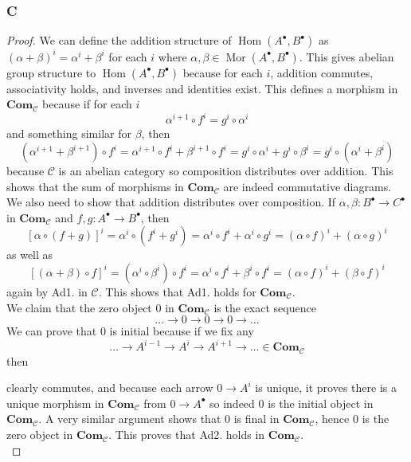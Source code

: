 \documentclass{article}
\newcommand{\fC}{\mathscr{C}}
\newcommand{\Com}{\mathbf{Com}} %
\DeclareMathOperator{\Hom}{\mathrm{Hom}}
\DeclareMathOperator{\Mor}{\mathrm{Mor}}
\begin{document}
\subsubsection{C}\label{1.6.C}
\begin{proof}
    We can define the addition structure of $\Hom(A^\bullet, B^\bullet)$ as $(\alpha+\beta)^i=\alpha^i+\beta^i$ for each $i$ where $\alpha,\beta\in \Mor(A^\bullet,B^\bullet)$. This gives abelian group structure to $\Hom(A^\bullet,B^\bullet)$ because for each $i$, addition commutes, associativity holds, and inverses and identities exist. This defines a morphism in $\Com_\fC$ because if for each $i$
    \[
    \alpha^{i+1}\circ f^i=g^i\circ \alpha^i
    \]
    and something similar for $\beta$, then
    \[
    (\alpha^{i+1}+\beta^{i+1})\circ f^i=\alpha^{i+1}\circ f^i+\beta^{i+1}\circ f^i=g^i\circ \alpha^i+g^i\circ \beta^i=g^i\circ (\alpha^i +\beta^i)
    \]
    because $\fC$ is an abelian category so composition distributes over addition. This shows that the sum of morphisms in $\Com_\fC$ are indeed commutative diagrams. We also need to show that addition distributes over composition. If $\alpha,\beta :B^\bullet \to C^\bullet$ in $\Com_\fC$ and $f,g:A^\bullet \to B^\bullet$, then
    \[
    [\alpha \circ(f+g)]^i=\alpha^i\circ(f^i+g^i)=\alpha^i\circ f^i+\alpha^i\circ g^i=(\alpha \circ f)^i+(\alpha \circ g)^i
    \]
    as well as
    \[
    [(\alpha+\beta)\circ f]^i=(\alpha^i\circ \beta^i)\circ f^i=\alpha^i\circ f^i+\beta^i\circ f^i=(\alpha \circ f)^i+(\beta\circ f)^i
    \]
    again by Ad1. in $\fC$.
    This shows that Ad1. holds for $\Com_\fC$.\\
    We claim that the zero object $0$ in $\Com_\fC$ is the exact sequence
    \[
    \dots \rightarrow0\rightarrow0\rightarrow0\rightarrow\dots
    \]
    We can prove that $0$ is initial because if we fix any
    \[
    \dots \rightarrow A^{i-1} \rightarrow A^i \rightarrow A^{i+1}\rightarrow \dots \in \Com_\fC
    \]
    then 
    \begin{center}
    \end{center}
    clearly commutes, and because each arrow $0\to A^i$ is unique, it proves there is a unique morphism in $\Com_\fC$ from $0\to A^\bullet$ so indeed $0$ is the initial object in $\Com_\fC$. A very similar argument shows that $0$ is final in $\Com_\fC$, hence $0$ is the zero object in $\Com_\fC$. This proves that Ad2. holds in $\Com_\fC$.\\

\end{proof}
\end{document}
